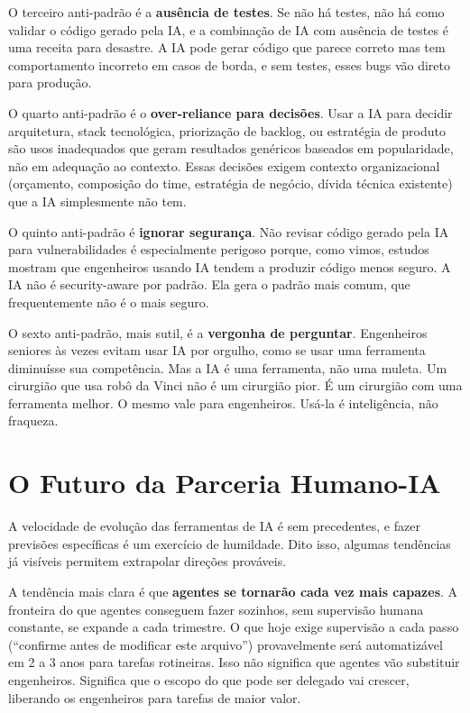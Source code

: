 O terceiro anti-padrão é a \textbf{ausência de testes}. Se não há testes, não há
como validar o código gerado pela IA, e a combinação de IA com ausência de testes
é uma receita para desastre. A IA pode gerar código que parece correto mas tem
comportamento incorreto em casos de borda, e sem testes, esses bugs vão direto para
produção.

O quarto anti-padrão é o \textbf{over-reliance para decisões}. Usar a IA para decidir
arquitetura, stack tecnológica, priorização de backlog, ou estratégia de produto são
usos inadequados que geram resultados genéricos baseados em popularidade, não em
adequação ao contexto. Essas decisões exigem contexto organizacional (orçamento,
composição do time, estratégia de negócio, dívida técnica existente) que a IA
simplesmente não tem.

O quinto anti-padrão é \textbf{ignorar segurança}. Não revisar código gerado pela IA
para vulnerabilidades é especialmente perigoso porque, como vimos, estudos mostram que
engenheiros usando IA tendem a produzir código menos seguro. A IA não é security-aware
por padrão. Ela gera o padrão mais comum, que frequentemente não é o mais seguro.

O sexto anti-padrão, mais sutil, é a \textbf{vergonha de perguntar}. Engenheiros
seniores às vezes evitam usar IA por orgulho, como se usar uma ferramenta diminuísse
sua competência. Mas a IA é uma ferramenta, não uma muleta. Um cirurgião que usa robô
da Vinci não é um cirurgião pior. É um cirurgião com uma ferramenta melhor. O mesmo
vale para engenheiros. Usá-la é inteligência, não fraqueza.

\section{O Futuro da Parceria Humano-IA}

A velocidade de evolução das ferramentas de IA é sem precedentes, e fazer
previsões específicas é um exercício de humildade. Dito isso, algumas
tendências já visíveis permitem extrapolar direções prováveis.

A tendência mais clara é que \textbf{agentes se tornarão cada vez mais capazes}. A
fronteira do que agentes conseguem fazer sozinhos, sem supervisão humana constante,
se expande a cada trimestre. O que hoje exige supervisão a cada passo (``confirme
antes de modificar este arquivo'') provavelmente será automatizável em 2 a 3 anos para
tarefas rotineiras. Isso não significa que agentes vão substituir engenheiros. Significa
que o escopo do que pode ser delegado vai crescer, liberando os engenheiros para tarefas
de maior valor.

